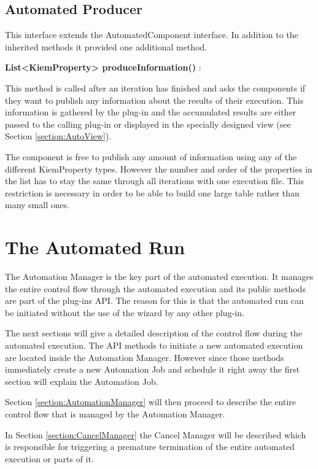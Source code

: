 \subsection{Automated Producer}
\label{section:AutomatedProducer}
This interface extends the AutomatedComponent interface.
In addition to the inherited methods it provided one additional method.

\begin{description}
 \item \textbf{List<KiemProperty> produceInformation()} : 

This method is called after an iteration has finished and asks the components
if they want to publish any information about the results of their execution.
This information is gathered by the plug-in and the accumulated results
are either passed to the calling plug-in or displayed in the
specially designed view (see Section \ref{section:AutoView}).

The component is free to publish any amount of information using any of the 
different KiemProperty types. However the number and order of the properties
in the list has to stay the same through all iterations with one execution file.
This restriction is necessary in order to be able to build one large table
rather than many small ones.
\end{description}


\section{The Automated Run}
\label{section:AutomatedRun}
The Automation Manager is the key part of the automated execution. It manages the entire control flow
through the automated execution and its public methods are part of the plug-ins \ac{API}. The reason
for this is that the automated run can be initiated without the use of the wizard by any other
plug-in.

The next sections will give a detailed description of the control flow during the automated execution.
The \ac{API} methods to initiate a new automated execution are located inside the Automation Manager. However
since those methods immediately create a new Automation Job and schedule it right away the first section will
explain the Automation Job. 

Section \ref{section:AutomationManager} will then proceed to describe the entire control flow that is managed by the Automation Manager.

In Section \ref{section:CancelManager} the Cancel Manager will be described which is
responsible for triggering a premature termination of the entire automated execution or parts
of it.


